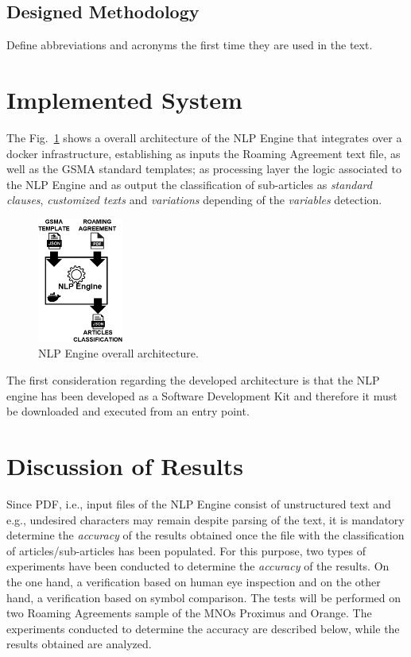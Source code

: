 \documentclass[conference]{style/IEEEtran}
\begin{document}
\subsection{Designed Methodology}
Define abbreviations and acronyms the first time they are used in the text.

\section{Implemented System}
The Fig.~\ref{fig1} shows a overall architecture of the NLP Engine that integrates over a docker infrastructure, establishing as inputs the Roaming Agreement text file, as well as the GSMA standard templates; as processing layer the logic associated to the NLP Engine and as output the classification of sub-articles as \textit{standard clauses}, \textit{customized texts} and \textit{variations} depending of the \textit{variables} detection.

\begin{figure}[htbp]
\centerline{\includegraphics[width=0.25\textwidth]{images/NLP_Engine.png}}
\caption{NLP Engine overall architecture.}
\label{fig1}
\end{figure}

The first consideration regarding the developed architecture is that the NLP engine has been developed as a Software Development Kit and therefore it must be downloaded and executed from an entry point. 

\section{Discussion of Results}
Since PDF, i.e., input files of the NLP Engine consist of unstructured text and e.g., undesired characters may remain despite parsing of the text, it is mandatory determine the \textit{accuracy} of the results obtained once the file with the classification of articles/sub-articles has been populated. For this purpose, two types of experiments have been conducted to determine the \textit{accuracy} of the results. On the one hand, a verification based on human eye inspection and on the other hand, a verification based on symbol comparison. The tests will be performed on two Roaming Agreements sample of the MNOs Proximus and Orange. The experiments conducted to determine the accuracy are described below, while the results obtained are analyzed.
\end{document}
